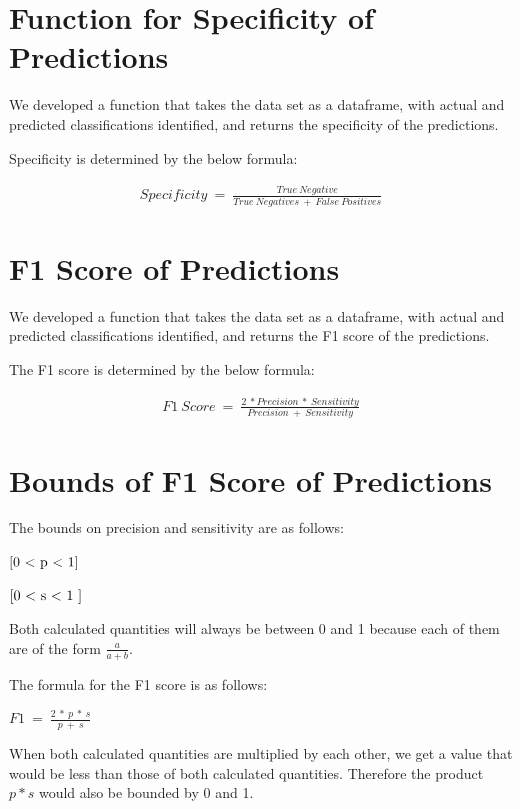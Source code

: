 \documentclass[]{article}
\begin{document}
\section{Function for Specificity of
Predictions}\label{function-for-specificity-of-predictions}

We developed a function that takes the data set as a dataframe, with
actual and predicted classifications identified, and returns the
specificity of the predictions.

Specificity is determined by the below formula:

\[
\begin{aligned}
Specificity~=~\frac{True~Negative}{True~Negatives~+~False~Positives}
\end{aligned}
\]

\section{F1 Score of Predictions}\label{f1-score-of-predictions}

We developed a function that takes the data set as a dataframe, with
actual and predicted classifications identified, and returns the F1
score of the predictions.

The F1 score is determined by the below formula:

\[
\begin{aligned}
F1~Score~=~\frac{2~*Precision~*~Sensitivity}{Precision~+~Sensitivity}
\end{aligned}
\]

\section{Bounds of F1 Score of
Predictions}\label{bounds-of-f1-score-of-predictions}

The bounds on precision and sensitivity are as follows:

\(\textnormal{[0~<~p~<~1]}\)

\(\textnormal{[0~<~s~<~1~]}\)

Both calculated quantities will always be between 0 and 1 because each
of them are of the form \(\frac{a}{a+b}\).

The formula for the F1 score is as follows:

\(F1~=~\frac{2~*~p~*~s}{p~+~s}\)

When both calculated quantities are multiplied by each other, we get a
value that would be less than those of both calculated quantities.
Therefore the product \(p*s\) would also be bounded by 0 and 1.
\end{document}
